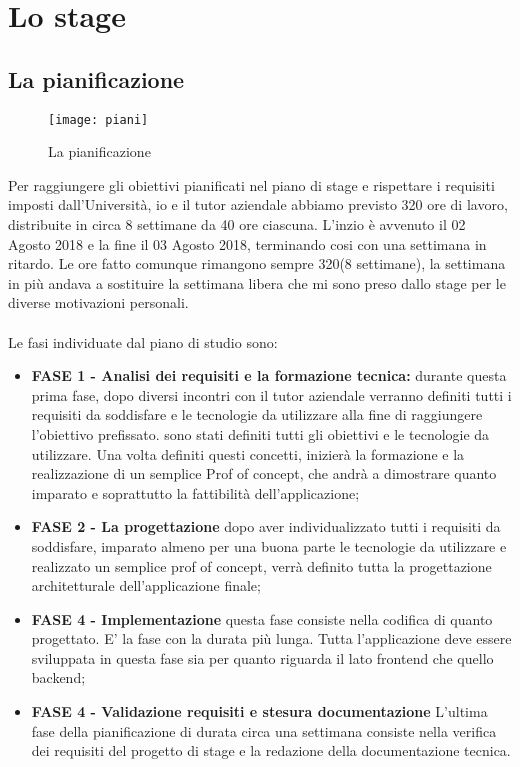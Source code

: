 
\chapter{Lo stage}
\label{cap:progettazione}
\label{sec:tecnologie-strumenti}
 \section{La pianificazione}
 \begin{figure}[!h] 
 	\centering 
 	\texttt{[image: piani]} 
 	\caption{La pianificazione}
 \end{figure}
Per raggiungere gli obiettivi pianificati nel piano di stage e rispettare i
requisiti imposti dall’Università, io e il tutor aziendale abbiamo
previsto 320 ore di lavoro, distribuite in circa 8 settimane da 40 ore ciascuna.
L'inzio è avvenuto il 02 Agosto 2018 e la fine il 03 Agosto 2018, 
terminando cosi con una settimana in ritardo. Le ore fatto comunque rimangono sempre 320(8 settimane), la settimana in più andava a sostituire la settimana libera che mi sono preso dallo stage per le diverse motivazioni personali. 
\\
\\
Le fasi individuate dal piano di studio sono:

\begin{itemize}
	\item \textbf{FASE 1 - Analisi dei requisiti e la formazione tecnica:} durante questa prima fase, dopo diversi incontri con il tutor aziendale verranno definiti tutti i requisiti da soddisfare e le tecnologie da utilizzare alla fine di raggiungere l'obiettivo prefissato. sono stati definiti tutti gli obiettivi e le tecnologie da utilizzare. Una volta definiti questi concetti, inizierà la formazione e la realizzazione di un semplice Prof of concept, che andrà a dimostrare quanto imparato e soprattutto la fattibilità dell'applicazione;
	\item \textbf{FASE 2 - La progettazione} dopo aver individualizzato tutti i requisiti da soddisfare, imparato almeno per una buona parte le tecnologie da utilizzare e realizzato un semplice prof of concept, verrà definito tutta la progettazione architetturale dell'applicazione finale;
		\item \textbf{FASE 4 - Implementazione} questa fase consiste nella codifica di quanto progettato. E' la fase con la durata più lunga. Tutta l'applicazione deve essere sviluppata in questa fase sia per quanto riguarda il lato frontend che quello backend;
		\item \textbf{FASE 4 - Validazione requisiti e stesura documentazione} L'ultima fase della pianificazione di durata circa una settimana consiste nella verifica dei requisiti
			del progetto di stage e la redazione della documentazione tecnica.
\end{itemize}
